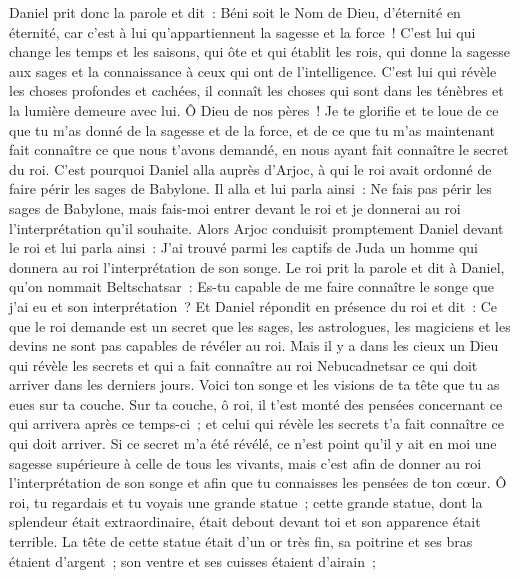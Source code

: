 \begin{multicols}{2}
Daniel prit donc la parole et dit~: Béni soit le Nom de Dieu, d'éternité en éternité, car c'est à lui qu'appartiennent la sagesse et la force~!
C'est lui qui change les temps et les saisons, qui ôte et qui établit les rois, qui donne la sagesse aux sages et la connaissance à ceux qui ont de l'intelligence.
C'est lui qui révèle les choses profondes et cachées, il connaît les choses qui sont dans les ténèbres et la lumière demeure avec lui.
Ô Dieu de nos pères~! Je te glorifie et te loue de ce que tu m'as donné de la sagesse et de la force, et de ce que tu m'as maintenant fait connaître ce que nous t'avons demandé, en nous ayant fait connaître le secret du roi.
C'est pourquoi Daniel alla auprès d'Arjoc, à qui le roi avait ordonné de faire périr les sages de Babylone. Il alla et lui parla ainsi~: Ne fais pas périr les sages de Babylone, mais fais-moi entrer devant le roi et je donnerai au roi l'interprétation qu'il souhaite.
Alors Arjoc conduisit promptement Daniel devant le roi et lui parla ainsi~: J'ai trouvé parmi les captifs de Juda un homme qui donnera au roi l'interprétation de son songe.
Le roi prit la parole et dit à Daniel, qu'on nommait Beltschatsar~: Es-tu capable de me faire connaître le songe que j'ai eu et son interprétation~?
Et Daniel répondit en présence du roi et dit~: Ce que le roi demande est un secret que les sages, les astrologues, les magiciens et les devins ne sont pas capables de révéler au roi.
Mais il y a dans les cieux un Dieu qui révèle les secrets et qui a fait connaître au roi Nebucadnetsar ce qui doit arriver dans les derniers jours. Voici ton songe et les visions de ta tête que tu as eues sur ta couche.
Sur ta couche, ô roi, il t'est monté des pensées concernant ce qui arrivera après ce temps-ci~; et celui qui révèle les secrets t'a fait connaître ce qui doit arriver.
Si ce secret m'a été révélé, ce n'est point qu'il y ait en moi une sagesse supérieure à celle de tous les vivants, mais c'est afin de donner au roi l'interprétation de son songe et afin que tu connaisses les pensées de ton cœur.
Ô roi, tu regardais et tu voyais une grande statue~; cette grande statue, dont la splendeur était extraordinaire, était debout devant toi et son apparence était terrible.
La tête de cette statue était d'un or très fin, sa poitrine et ses bras étaient d'argent~; son ventre et ses cuisses étaient d'airain~;

\end{multicols}
